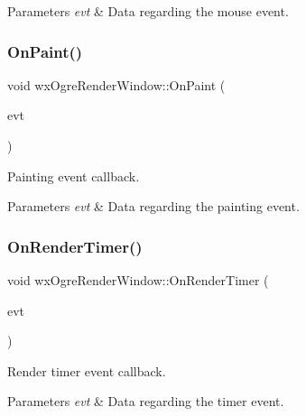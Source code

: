 \begin{DoxyParams}{Parameters}
{\em evt} & Data regarding the mouse event. \\
\hline
\end{DoxyParams}
\mbox{\label{classwx_ogre_render_window_ae3394f8187616e6aa310195001632359}} 
\subsubsection{\texorpdfstring{On\+Paint()}{OnPaint()}}
{\footnotesize\ttfamily void wx\+Ogre\+Render\+Window\+::\+On\+Paint (\begin{DoxyParamCaption}\item[{wx\+Paint\+Event \&}]{evt }\end{DoxyParamCaption})\hspace{0.3cm}{\ttfamily [virtual]}}

Painting event callback. 
\begin{DoxyParams}{Parameters}
{\em evt} & Data regarding the painting event. \\
\hline
\end{DoxyParams}
\mbox{\label{classwx_ogre_render_window_a4065f34eb3af7813f1b79ee6ba0d269f}} 
\subsubsection{\texorpdfstring{On\+Render\+Timer()}{OnRenderTimer()}}
{\footnotesize\ttfamily void wx\+Ogre\+Render\+Window\+::\+On\+Render\+Timer (\begin{DoxyParamCaption}\item[{wx\+Timer\+Event \&}]{evt }\end{DoxyParamCaption})\hspace{0.3cm}{\ttfamily [virtual]}}

Render timer event callback. 
\begin{DoxyParams}{Parameters}
{\em evt} & Data regarding the timer event. \\
\hline
\end{DoxyParams}
\mbox{\label{classwx_ogre_render_window_a2ed6d1321e36951bc9c9bcb42ca1a32e}} 
